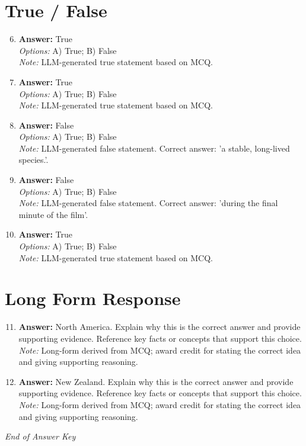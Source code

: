 \documentclass[12pt]{article}
\begin{document}
\section*{True / False}
\begin{enumerate}[label=\arabic*.]
\setcounter{enumi}{5}
\item \textbf{Answer:} True
\\ \textit{Options:} A) True; B) False
\\ \textit{Note:} LLM-generated true statement based on MCQ.
\item \textbf{Answer:} True
\\ \textit{Options:} A) True; B) False
\\ \textit{Note:} LLM-generated true statement based on MCQ.
\item \textbf{Answer:} False
\\ \textit{Options:} A) True; B) False
\\ \textit{Note:} LLM-generated false statement. Correct answer: 'a stable, long-lived species.'.
\item \textbf{Answer:} False
\\ \textit{Options:} A) True; B) False
\\ \textit{Note:} LLM-generated false statement. Correct answer: 'during the final minute of the film'.
\item \textbf{Answer:} True
\\ \textit{Options:} A) True; B) False
\\ \textit{Note:} LLM-generated true statement based on MCQ.
\end{enumerate}

\section*{Long Form Response}
\begin{enumerate}[label=\arabic*.]
\setcounter{enumi}{10}
\item \textbf{Answer:} North America. Explain why this is the correct answer and provide supporting evidence.
Reference key facts or concepts that support this choice.
\\ \textit{Note:} Long-form derived from MCQ; award credit for stating the correct idea and giving supporting reasoning.
\item \textbf{Answer:} New Zealand. Explain why this is the correct answer and provide supporting evidence.
Reference key facts or concepts that support this choice.
\\ \textit{Note:} Long-form derived from MCQ; award credit for stating the correct idea and giving supporting reasoning.
\end{enumerate}

\vfill
\noindent\textit{End of Answer Key}
\end{document}
